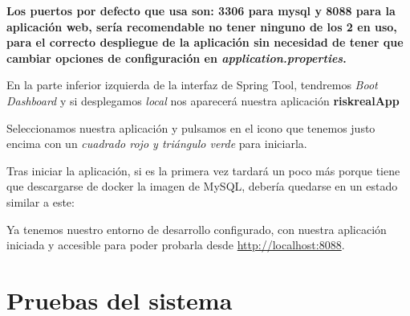 \textbf{Los puertos por defecto que usa son: 3306 para mysql y 8088 para la aplicación web, sería recomendable no tener ninguno de los 2 en uso, para el correcto despliegue de la aplicación sin necesidad de tener que cambiar opciones de configuración en \textit{application.properties}.}

En la parte inferior izquierda de la interfaz de Spring Tool, tendremos \textit{Boot Dashboard} y si desplegamos \textit{local} nos aparecerá nuestra aplicación \textbf{riskrealApp}

Seleccionamos nuestra aplicación y pulsamos en el icono que tenemos justo encima con un \textit{cuadrado rojo y triángulo verde} para iniciarla.


Tras iniciar la aplicación, si es la primera vez tardará un poco más porque tiene que descargarse de docker la imagen de MySQL, debería quedarse en un estado similar a este:



Ya tenemos nuestro entorno de desarrollo configurado, con nuestra aplicación iniciada y accesible para poder probarla desde \url{http://localhost:8088}.



\section{Pruebas del sistema}
